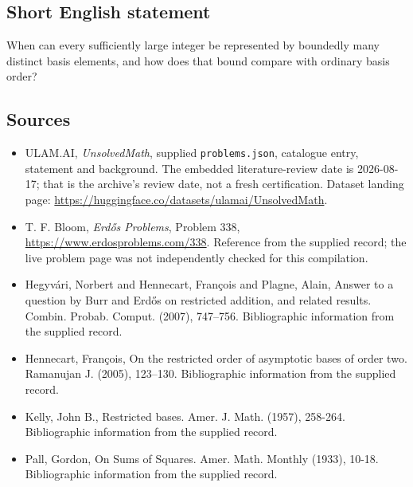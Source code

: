 \documentclass[11pt,a4paper]{article}
\begin{document}
\subsection{Short English statement}

When can every sufficiently large integer be represented by boundedly many distinct basis elements, and how does that bound compare with ordinary basis order?

\subsection{Sources}

{\small

\begin{itemize}

\item[\hypertarget{source:statement:1}{S1}] ULAM.AI, \emph{UnsolvedMath}, supplied \texttt{problems.json}, catalogue entry, statement and background. The embedded literature-review date is 2026-08-17; that is the archive’s review date, not a fresh certification. Dataset landing page: \url{https://huggingface.co/datasets/ulamai/UnsolvedMath}.

\item[\hypertarget{source:statement:2}{S2}] T. F. Bloom, \emph{Erdős Problems}, Problem 338, \url{https://www.erdosproblems.com/338}. Reference from the supplied record; the live problem page was not independently checked for this compilation.

\item[\hypertarget{source:statement:3}{S3}] Hegyv\'ari, Norbert and Hennecart, Fran\c cois and Plagne, Alain, Answer to a question by {B}urr and {E}rd\H{o}s on restricted addition, and related results. Combin. Probab. Comput. (2007), 747--756. Bibliographic information from the supplied record.

\item[\hypertarget{source:statement:4}{S4}] Hennecart, Fran\c cois, On the restricted order of asymptotic bases of order two. Ramanujan J. (2005), 123--130. Bibliographic information from the supplied record.

\item[\hypertarget{source:statement:5}{S5}] Kelly, John B., Restricted bases. Amer. J. Math. (1957), 258-264. Bibliographic information from the supplied record.

\item[\hypertarget{source:statement:6}{S6}] Pall, Gordon, On Sums of Squares. Amer. Math. Monthly (1933), 10-18. Bibliographic information from the supplied record.

\end{itemize}

}

\label{end:statement}
\end{document}
